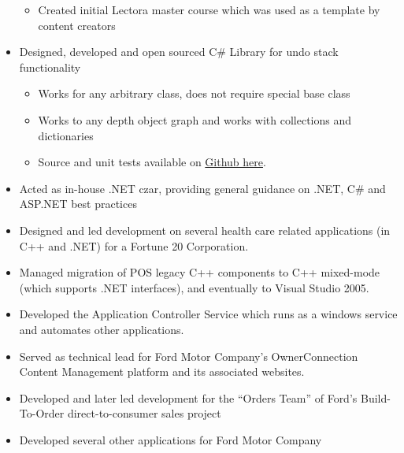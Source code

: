 \documentclass[12pt,letterpaper,sans]{moderncv}
\begin{document}
\begin{itemize}[leftmargin=1.24in]
\begin{itemize}
                \item Created initial Lectora master course which was used as a template by content creators
            \end{itemize}
        \item Designed, developed and open sourced C\# Library for undo stack functionality
            \begin{itemize}
                \item Works for any arbitrary class, does not require special base class
                \item Works to any depth object graph and works with collections and dictionaries
                \item Source and unit tests available on \href{https://github.com/jasallen/ShadowedObjects}{Github here}.
            \end{itemize}
        \item Acted as in-house .NET czar, providing general guidance on .NET, C\# and ASP.NET best practices
    \end{itemize}
    \begin{itemize}[leftmargin=1.24in]
        \item Designed and led development on several health care related applications (in C++ and .NET) for a Fortune 20 Corporation.
        \item Managed migration of POS legacy C++ components to C++ mixed-mode (which supports .NET interfaces), and eventually to Visual Studio 2005.
        \item Developed the Application Controller Service which runs as a windows service and automates other applications.
    \end{itemize}
    \begin{itemize}[leftmargin=1.24in]
        \item Served as technical lead for Ford Motor Company's OwnerConnection Content Management platform and its associated websites.  
        \item Developed and later led development for the ``Orders Team'' of Ford's Build-To-Order direct-to-consumer sales project
        \item Developed several other applications for Ford Motor Company
    \end{itemize}
\end{document}
